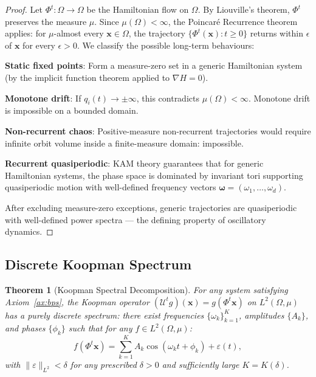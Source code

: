 \documentclass[11pt,twocolumn,a4paper]{article}
\newtheorem{theorem}{Theorem}[section]
\theoremstyle{definition}
\theoremstyle{remark}
\begin{document}
\begin{proof}
Let $\Phi^t: \Omega \to \Omega$ be the Hamiltonian flow on $\Omega$. By Liouville's
theorem, $\Phi^t$ preserves the measure $\mu$. Since $\mu(\Omega) < \infty$, the
Poincar\'{e} Recurrence theorem \citep{poincare1890} applies: for $\mu$-almost
every $\mathbf{x} \in \Omega$, the trajectory $\{\Phi^t(\mathbf{x}): t \geq 0\}$
returns within $\epsilon$ of $\mathbf{x}$ for every $\epsilon > 0$.
We classify the possible long-term behaviours:

\noindent\textbf{Static fixed points}: Form a measure-zero set in a generic
Hamiltonian system (by the implicit function theorem applied to $\nabla H = 0$).

\noindent\textbf{Monotone drift}: If $q_i(t) \to \pm\infty$, this contradicts
$\mu(\Omega) < \infty$. Monotone drift is impossible on a bounded domain.

\noindent\textbf{Non-recurrent chaos}: Positive-measure non-recurrent trajectories
would require infinite orbit volume inside a finite-measure domain: impossible.

\noindent\textbf{Recurrent quasiperiodic}: KAM theory \citep{kolmogorov1954,
arnold1963, moser1962} guarantees that for generic Hamiltonian systems, the
phase space is dominated by invariant tori supporting quasiperiodic motion with
well-defined frequency vectors $\bm{\omega} = (\omega_1, \ldots, \omega_d)$.

After excluding measure-zero exceptions, generic trajectories are quasiperiodic
with well-defined power spectra --- the defining property of oscillatory dynamics.
\end{proof}

\subsection{Discrete Koopman Spectrum}

\begin{theorem}[Koopman Spectral Decomposition]
\label{thm:koopman}
For any system satisfying Axiom~\ref{ax:bps}, the Koopman operator
$(\mathcal{U}^t g)(\mathbf{x}) = g(\Phi^t \mathbf{x})$ on $L^2(\Omega, \mu)$
has a purely discrete spectrum: there exist frequencies $\{\omega_k\}_{k=1}^K$,
amplitudes $\{A_k\}$, and phases $\{\phi_k\}$ such that for any
$f \in L^2(\Omega, \mu)$:
\begin{equation}
f(\Phi^t \mathbf{x}) = \sum_{k=1}^K A_k \cos(\omega_k t + \phi_k) + \varepsilon(t),
\label{eq:koopman}
\end{equation}
with $\|\varepsilon\|_{L^2} < \delta$ for any prescribed $\delta > 0$ and
sufficiently large $K = K(\delta)$.
\end{theorem}
\end{document}
